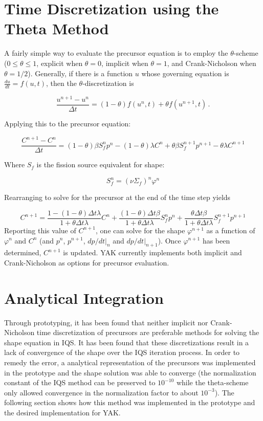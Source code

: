 \documentclass[11pt]{tamurmemo}
\newcommand{\be}{\begin{equation}}
\newcommand{\ee}{\end{equation}}
\begin{document}
\section{Time Discretization using the Theta Method}

A fairly simple way to evaluate the precursor equation is to employ the $\theta$-scheme ($0\le\theta\le1$,
explicit when $\theta=0$, implicit when $\theta=1$, and Crank-Nicholson when $\theta=1/2$).
Generally, if there is a function $u$ whose governing equation is $\frac{du}{dt}=f(u,t)$,
then the $\theta$-discretization is

\be
\frac{u^{n+1}-u^n}{\Delta t}=(1-\theta)f(u^n,t) + \theta f(u^{n+1},t) \,.
\ee

Applying this to the precursor equation:

\be
\frac{C^{n+1}-C^n}{\Delta t}=(1-\theta)\beta S_f^np^n-(1-\theta)\lambda C^n + \theta\beta S_f^{n+1}p^{n+1}-\theta\lambda C^{n+1}
\ee

Where $S_f$ is the fission source equivalent for shape:

\be
S_f^n=(\nu\Sigma_f)^n\varphi^n
\ee

Rearranging to solve for the precursor at the end of the time step yields

\be
C^{n+1} = \frac{1-(1-\theta)\Delta t\lambda}{1+\theta\Delta t\lambda}C^n + \frac{(1-\theta)\Delta t \beta}{1+\theta\Delta t\lambda}S_f^n p^n +  \frac{\theta\Delta t \beta}{1+\theta\Delta t\lambda}S_f^{n+1} p^{n+1}
\ee
Reporting this value of $C^{n+1}$, one can solve for the shape $\varphi^{n+1}$ as a function of $\varphi^n$ and $C^n$
(and $p^n$, $p^{n+1}$, $dp/dt|_n$ and  $dp/dt|_{n+1}$).
Once $\varphi^{n+1}$ has been determined, $C^{n+1}$ is updated. YAK currently implements both implicit and Crank-Nicholson as options for precursor evaluation.

\bigskip


\section{Analytical Integration}

Through prototyping, it has been found that neither implicit nor Crank-Nicholson time discretization of precursors are preferable methods for solving the shape equation in IQS.  It has been found that these discretizations result in a lack of convergence of the shape over the IQS iteration process.  In order to remedy the error, a analytical representation of the precursors was implemented in the prototype and the shape solution was able to converge (the normalization constant of the IQS method can be preserved to $10^{-10}$ while the theta-scheme only allowed convergence in the normalization factor to about $10^{-3}$).  The following section shows how this method was implemented in the prototype and the desired implementation for YAK.
\end{document}
